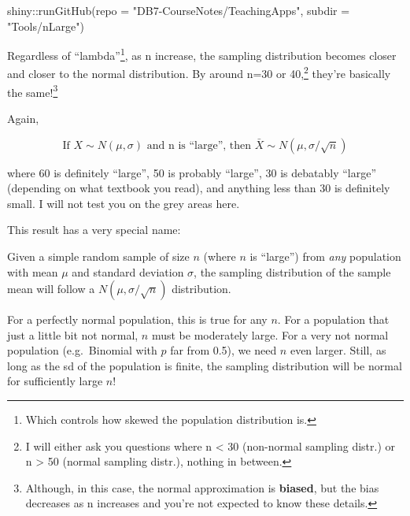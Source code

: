 \documentclass[
  letterpaper,
  DIV=11,
  numbers=noendperiod,
  oneside]{scrreprt}
\newenvironment{Shaded}{\begin{snugshade}}{\end{snugshade}}
\newcommand{\AttributeTok}[1]{\textcolor[rgb]{0.40,0.45,0.13}{#1}}
\newcommand{\FunctionTok}[1]{\textcolor[rgb]{0.28,0.35,0.67}{#1}}
\newcommand{\NormalTok}[1]{\textcolor[rgb]{0.00,0.23,0.31}{#1}}
\newcommand{\SpecialCharTok}[1]{\textcolor[rgb]{0.37,0.37,0.37}{#1}}
\newcommand{\StringTok}[1]{\textcolor[rgb]{0.13,0.47,0.30}{#1}}
\begin{document}
\begin{Shaded}
\begin{Highlighting}[]
\NormalTok{shiny}\SpecialCharTok{::}\FunctionTok{runGitHub}\NormalTok{(}\AttributeTok{repo =} \StringTok{"DB7{-}CourseNotes/TeachingApps"}\NormalTok{, }
    \AttributeTok{subdir =} \StringTok{"Tools/nLarge"}\NormalTok{)}
\end{Highlighting}
\end{Shaded}

Regardless of ``lambda''\footnote{Which controls how skewed the
  population distribution is.}, as n increase, the sampling distribution
becomes closer and closer to the normal distribution. By around n=30 or
40,\footnote{I will either ask you questions where n \textless{} 30
  (non-normal sampling distr.) or n \textgreater{} 50 (normal sampling
  distr.), nothing in between.} they're basically the same!\footnote{Although,
  in this case, the normal approximation is \textbf{biased}, but the
  bias decreases as n increases and you're not expected to know these
  details.}

Again,

\[
\text{If }X\sim N(\mu, \sigma)\text{ and n is ``large'', then }\bar X\sim N(\mu,\sigma/\sqrt{n})
\]

where 60 is definitely ``large'', 50 is probably ``large'', 30 is
debatably ``large'' (depending on what textbook you read), and anything
less than 30 is definitely small. I will not test you on the grey areas
here.

This result has a very special name:

\begin{tcolorbox}[enhanced jigsaw, toprule=.15mm, colbacktitle=quarto-callout-note-color!10!white, title=\textcolor{quarto-callout-note-color}{\faInfo}\hspace{0.5em}{The Central Limit Theorem}, arc=.35mm, colframe=quarto-callout-note-color-frame, colback=white, titlerule=0mm, left=2mm, bottomtitle=1mm, bottomrule=.15mm, breakable, opacitybacktitle=0.6, leftrule=.75mm, toptitle=1mm, coltitle=black, rightrule=.15mm, opacityback=0]

Given a simple random sample of size \(n\) (where \(n\) is ``large'')
from \emph{any} population with mean \(\mu\) and standard deviation
\(\sigma\), the sampling distribution of the sample mean will follow a
\(N(\mu, \sigma/\sqrt{n})\) distribution.

\end{tcolorbox}

For a perfectly normal population, this is true for any \(n\). For a
population that just a little bit not normal, \(n\) must be moderately
large. For a very not normal population (e.g.~Binomial with \(p\) far
from 0.5), we need \(n\) even larger. Still, as long as the sd of the
population is finite, the sampling distribution will be normal for
sufficiently large \(n\)!
\end{document}
